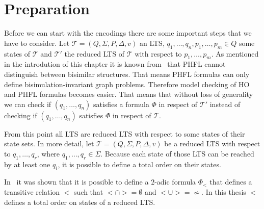 \section{Preparation}\label{sec:lower_bounds_preparation}

Before we can start with the encodings there are some important steps that we have to consider.  Let $\mathcal{T} = (Q, 
\Sigma, P, \Delta, v)$ an LTS, $q_1, \dots, q_n, p_1, \dots, p_m \in Q$ some states of $\mathcal{T}$ and $\mathcal{T}'$ the 
reduced LTS of $\mathcal{T}$ with respect to $p_1, \dots, p_m$.  
As mentioned in the introdution of this chapter it is known from~\cite{lange2014capturing} that PHFL cannot distinguish 
between bisimilar structures. That means PHFL formulas can only define bisimulation-invariant graph problems. Therefore model checking of HO and PHFL formulas becomes easier. That means that without loss of generality we can check if $(q_1, \dots, q_n)$ satisfies a formula $\Phi$ in respect of $\mathcal{T}'$ instead of checking if $(q_1, \dots, q_n)$ satisfies 
$\Phi$ in respect of $\mathcal{T}$. 

From this point all LTS are reduced LTS with respect to some states of their state sets. In more detail, let $\mathcal{T} = (Q, \Sigma, P, \Delta, v)$ be a reduced LTS with respect to $q_1, \dots, q_r$, where $q_1, \dots, q_r \in \Sigma$. Because each state of those LTS can be reached by at least one $q_i$, it is possible to define a total order on their states. 

\begin{remark} \label{remark:transitive_relation}
    In~\cite{otto1999bisimulation} it was shown that it is possible to define a $2$-adic formula $\Phi_<$ that defines a
    transitive relation $<$ such that $< \cap > = \emptyset$ and $< \cup > = \not\sim$. In this thesis $<$ defines a total
    order on states of a reduced LTS.
\end{remark}